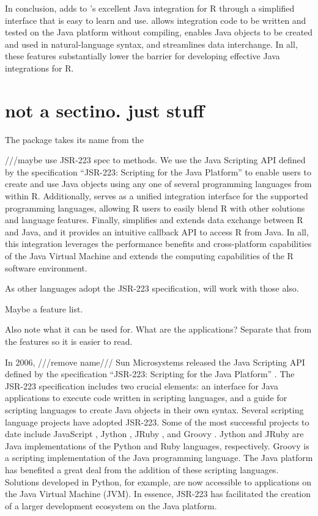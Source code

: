 In conclusion,  adds to 's excellent Java integration for R through a simplified interface that is easy to learn and use.  allows integration code to be written and tested on the Java platform without compiling, enables Java objects to be created and used in natural-language syntax, and streamlines data interchange. In all, these features substantially lower the barrier for developing effective Java integrations for R.

\section{not a sectino. just stuff}

The  package takes its name from the 

///maybe use JSR-223 spec to methods.
We use the Java Scripting API defined by the specification “JSR-223: Scripting for the Java Platform” \citep{jsr223spec} to enable users to create and use Java objects using any one of several programming languages from within R. Additionally,  serves as a unified integration interface for the supported programming languages, allowing R users to easily blend R with other solutions and language features. Finally,  simplifies and extends data exchange between R and Java, and it provides an intuitive callback API to access R from Java. In all, this integration leverages the performance benefits and cross-platform capabilities of the Java Virtual Machine and extends the computing capabilities of the R software environment.


As other languages adopt the JSR-223 specification,  will work with those also.

Maybe a feature list.

Also note what it can be used for. What are the applications? Separate that from the features so it is easier to read.

In 2006, ///remove name/// Sun Microsystems released the Java Scripting API \citep{jsa} defined by the specification “JSR-223: Scripting for the Java Platform” \citep{jsr223spec}. The JSR-223 specification includes two crucial elements: an interface for Java applications to execute code written in scripting languages, and a guide for scripting languages to create Java objects in their own syntax. Several scripting language projects have adopted JSR-223. Some of the most successful projects to date include JavaScript \citep{jsnashorn}, Jython \citep{jython}, JRuby \citep{jruby}, and Groovy \citep{groovy}. Jython and JRuby are Java implementations of the Python \citep{python} and Ruby \citep{ruby} languages, respectively. Groovy is a scripting implementation of the Java programming language. The Java platform has benefited a great deal from the addition of these scripting languages. Solutions developed in Python, for example, are now accessible to applications on the Java Virtual Machine (JVM). In essence, JSR-223 has facilitated the creation of a larger development ecosystem on the Java platform.

